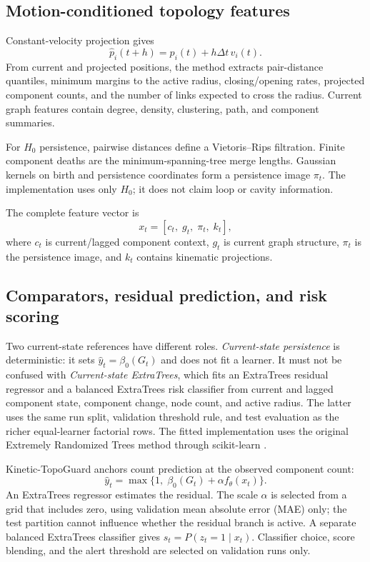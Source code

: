 \documentclass[final,5p,times,twocolumn]{elsarticle}
\begin{document}
\subsection{Motion-conditioned topology features}

Constant-velocity projection gives
\begin{equation}
\hat p_i(t+h)=p_i(t)+h\Delta t\,v_i(t).
\end{equation}
From current and projected positions, the method extracts pair-distance quantiles,
minimum margins to the active radius, closing/opening rates, projected component counts,
and the number of links expected to cross the radius. Current graph features contain
degree, density, clustering, path, and component summaries.

For $H_0$ persistence, pairwise distances define a Vietoris--Rips filtration. Finite
component deaths are the minimum-spanning-tree merge lengths. Gaussian kernels on birth
and persistence coordinates form a persistence image $\pi_t$. The implementation uses
only $H_0$; it does not claim loop or cavity information.

The complete feature vector is
\begin{equation}
x_t=[c_t,\;g_t,\;\pi_t,\;k_t],
\end{equation}
where $c_t$ is current/lagged component context, $g_t$ is current graph structure,
$\pi_t$ is the persistence image, and $k_t$ contains kinematic projections.

\subsection{Comparators, residual prediction, and risk scoring}

Two current-state references have different roles. \emph{Current-state persistence} is
deterministic: it sets $\hat y_t=\beta_0(G_t)$ and does not fit a learner. It must not be
confused with \emph{Current-state ExtraTrees}, which fits an ExtraTrees residual regressor
and a balanced ExtraTrees risk classifier from current and lagged component state, component
change, node count, and active radius. The latter uses the same run split, validation
threshold rule, and test evaluation as the richer equal-learner factorial rows.
The fitted implementation uses the original Extremely Randomized Trees method through
scikit-learn \cite{geurts2006extremely,pedregosa2011scikit}.

Kinetic-TopoGuard anchors count prediction at the observed component count:
\begin{equation}
\hat y_t=\max\{1,\;\beta_0(G_t)+\alpha f_{\theta}(x_t)\}.
\end{equation}
An ExtraTrees regressor estimates the residual. The scale $\alpha$ is selected from a grid
that includes zero, using validation mean absolute error (MAE) only; the test partition
cannot influence whether the residual branch is active. A separate balanced ExtraTrees
classifier gives $s_t=P(z_t=1\mid x_t)$. Classifier choice, score blending, and the alert
threshold are selected on validation runs only.
\end{document}
